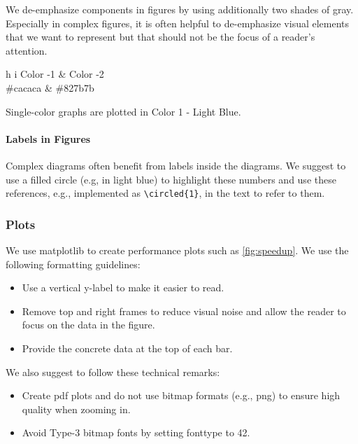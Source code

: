 \documentclass[conference]{IEEEtran}
\newenvironment{draftonly}{}{}
\DeclareRobustCommand\circled[2][]{\ifthenelse{\isempty{#1}}{\tikz[baseline=(char.base)]{\node[shape=circle,fill=pairedOneLightBlue,inner sep=1pt] (char) {#2};}}{\autoref{#1}: \hyperref[#1]{\tikz[baseline=(char.base)]{\node[shape=circle,fill=pairedOneLightBlue,inner sep=1pt] (char) {#2};}}}}
\begin{document}
\begin{draftonly}
We de-emphasize components in figures by using additionally two shades of gray.
Especially in complex figures, it is often helpful to de-emphasize visual
elements that we want to represent but that should not be the focus of a
reader's attention.

\medskip
{
	\small
{}

\begin{tabular}{h i}
Color -1 & Color -2\\
\#cacaca & \#827b7b\\
\end{tabular}
}

Single-color graphs are plotted in Color 1 - Light Blue.

\paragraph{Labels in Figures}
Complex diagrams often benefit from labels inside the diagrams. We suggest to
use a filled circle (e.g, in light blue) to highlight these numbers and use
these references, e.g., \circled{1} implemented as \texttt{\textbackslash{}circled\{1\}}, in the text to refer to them.

\subsubsection{Plots} We use matplotlib to create performance
plots such as \autoref{fig:speedup}. We use the following
formatting guidelines:
\begin{itemize}
  \item Use a vertical y-label to make it easier to read.
  \item Remove top and right frames to reduce visual noise
	and allow the reader to focus on the data in the
	figure.
  \item Provide the concrete data at the top of each bar.
\end{itemize}

\noindent
We also suggest to follow these technical remarks:
\begin{itemize}
  \item Create pdf plots and do not use bitmap formats (e.g., png) to
	ensure high quality when zooming in.
  \item Avoid Type-3 bitmap fonts by
	setting fonttype to 42.
\end{itemize}


\end{draftonly}
\end{document}
